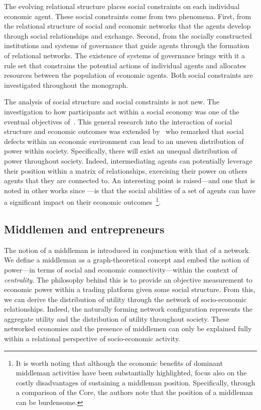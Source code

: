 The evolving relational structure places social constraints on each individual economic agent. These social constraints come from two phenomena. First, from the relational structure of social and economic networks that the agents develop through social relationships and exchange. Second, from the socially constructed institutions and systems of governance that guide agents through the formation of relational networks. The existence of systems of governance brings with it a rule set that constrains the potential actions of individual agents and allocates resources between the population of economic agents. Both social constraints are investigated throughout the monograph.

The analysis of social structure and social constraints is not new. The investigation to how participants act within a social economy was one of the eventual objectives of~\citet{vNM}. This general research into the interaction of social structure and economic outcomes was extended by~\citet{KalaiMiddlemen1978} who remarked that social defects within an economic environment can lead to an uneven distribution of power within society. Specifically, there will exist an unequal distribution of power throughout society. Indeed, intermediating agents can potentially leverage their position within a matrix of relationships, exercising their power on others agents that they are connected to. An interesting point is raised---and one that is noted in other works since \citet{Granovetter2005}---is that the social abilities of a set of agents can have a significant impact on their economic outcomes~\footnote{It is worth noting that although the economic benefits of dominant middleman activities have been substantially highlighted, \citet{KalaiMiddlemen1978} focus also on the costly disadvantages of sustaining a middleman position. Specifically, through a comparison of the Core, the authors note that the position of a middleman can be burdensome.}.

\subsection{Middlemen and entrepreneurs}

The notion of a middleman is introduced in conjunction with that of a network. We define a middleman as a graph-theoretical concept and embed the notion of power---in terms of social and economic connectivity---within the context of \emph{centrality}. The philosophy behind this is to provide an objective measurement to economic power within a trading platform given some social structure. From this, we can derive the distribution of utility through the network of socio-economic relationships. Indeed, the naturally forming network configuration represents the aggregate utility and the distribution of utility throughout society. These networked economies and the presence of middlemen can only be explained fully within a relational perspective of socio-economic activity.

